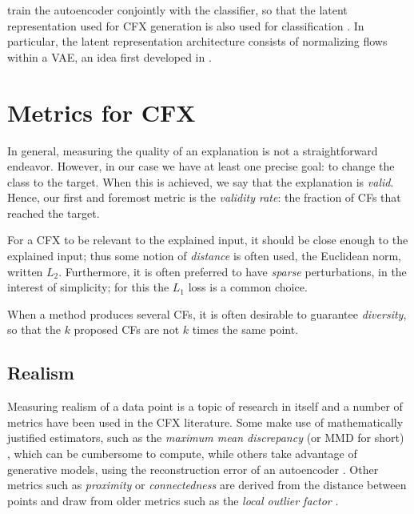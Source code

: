 \documentclass[../main.tex]{subfiles}
\begin{document}
\citeauthor{zhangInterpretable2022} train the autoencoder conjointly with the classifier, so that the latent representation used for CFX generation is also used for classification \cite{zhangInterpretable2022}.
In particular, the latent representation architecture consists of normalizing flows within a VAE, an idea first developed in \cite{rezendeVariational2015}.

\section{Metrics for CFX}

In general, measuring the quality of an explanation is not a straightforward endeavor.
However, in our case we have at least one precise goal: to change the class to the target.
When this is achieved, we say that the explanation is \emph{valid}.
Hence, our first and foremost metric is the \emph{validity rate}: the fraction of CFs that reached the target.

For a CFX to be relevant to the explained input, it should be close enough to the explained input; thus some notion of \emph{distance} is often used, \eg{} the Euclidean norm, written $L_2$.
Furthermore, it is often preferred to have \emph{sparse} perturbations, in the interest of simplicity; for this the $L_1$ loss is a common choice. \citenote{}

When a method produces several CFs, it is often desirable to guarantee \emph{diversity}, so that the $k$ proposed CFs are not $k$ times the same point.

\subsection{Realism}

Measuring realism of a data point is a topic of research in itself and a number of metrics have been used in the CFX literature.
Some make use of mathematically justified estimators, such as the \emph{maximum mean discrepancy} (or MMD for short) \cite{zhangInterpretable2022}, which can be cumbersome to compute, while others take advantage of generative models, \eg{} using the reconstruction error of an autoencoder \cite{vanlooverenInterpretable2021}.
Other metrics such as \emph{proximity} or \emph{connectedness} \cite{laugelIssues2019} are derived from the distance between points and draw from older metrics such as the \emph{local outlier factor} \cite{breunigLOF2000}.
\end{document}
